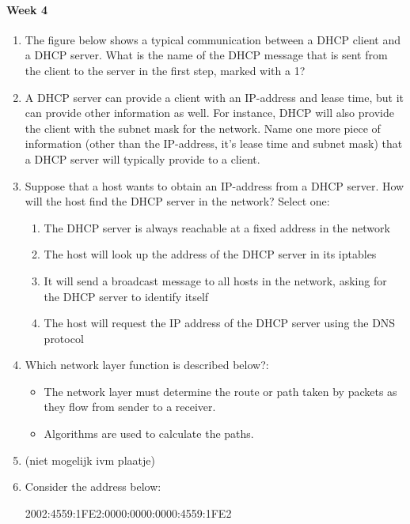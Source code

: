 \paragraph{Week 4}
\begin{enumerate}
    \item The figure below shows a typical communication between a DHCP client and a DHCP server. What is the name of the DHCP message that is sent from the client to the server in the first step, marked with a 1?
    \item A DHCP server can provide a client with an IP-address and lease time, but it can provide other information as well. For instance, DHCP will also provide the client with the subnet mask for the network. Name one more piece of information (other than the IP-address, it's lease time and subnet mask) that a DHCP server will typically provide to a client.
    \item Suppose that a host wants to obtain an IP-address from a DHCP server. How will the host find the DHCP server in the network?
    Select one:
    \begin{enumerate}
        \item The DHCP server is always reachable at a fixed address in the network
        \item The host will look up the address of the DHCP server in its iptables
        \item It will send a broadcast message to all hosts in the network, asking for the DHCP server to identify itself
        \item The host will request the IP address of the DHCP server using the DNS protocol
    \end{enumerate}
    \item Which network layer function is described below?:
    \begin{itemize}
        \item The network layer must determine the route or path taken by packets as they flow from sender to a receiver.
        \item Algorithms are used to calculate the paths.
    \end{itemize}
    \item (niet mogelijk ivm plaatje)
    \item Consider the address below:

    2002:4559:1FE2:0000:0000:0000:4559:1FE2


\end{enumerate}
